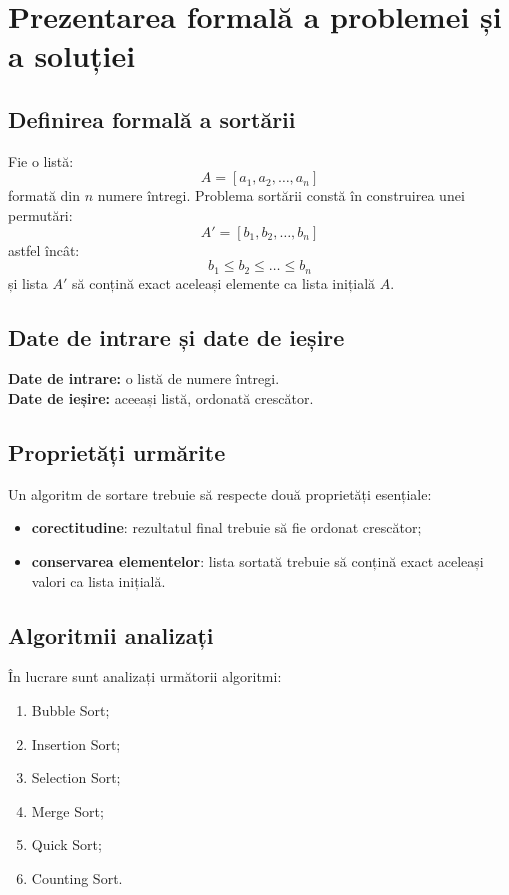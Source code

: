 \documentclass[a4paper,12pt]{article}
\begin{document}
\section{Prezentarea formală a problemei și a soluției}

\subsection{Definirea formală a sortării}
Fie o listă:
\[
A = [a_1, a_2, \dots, a_n]
\]
formată din $n$ numere întregi. Problema sortării constă în construirea unei permutări:
\[
A' = [b_1, b_2, \dots, b_n]
\]
astfel încât:
\[
b_1 \leq b_2 \leq \dots \leq b_n
\]
și lista $A'$ să conțină exact aceleași elemente ca lista inițială $A$.

\subsection{Date de intrare și date de ieșire}
\textbf{Date de intrare:} o listă de numere întregi.\\
\textbf{Date de ieșire:} aceeași listă, ordonată crescător.

\subsection{Proprietăți urmărite}
Un algoritm de sortare trebuie să respecte două proprietăți esențiale:
\begin{itemize}
    \item \textbf{corectitudine}: rezultatul final trebuie să fie ordonat crescător;
    \item \textbf{conservarea elementelor}: lista sortată trebuie să conțină exact aceleași valori ca lista inițială.
\end{itemize}

\subsection{Algoritmii analizați}
În lucrare sunt analizați următorii algoritmi:
\begin{enumerate}
    \item Bubble Sort;
    \item Insertion Sort;
    \item Selection Sort;
    \item Merge Sort;
    \item Quick Sort;
    \item Counting Sort.
\end{enumerate}
\end{document}
